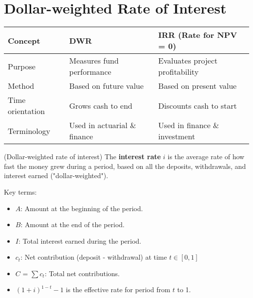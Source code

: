 \section{Dollar-weighted Rate of Interest}
\begin{table}[H]
\begin{center}
\renewcommand{\arraystretch}{1.5}
    \begin{tabular}{@{} l l l @{}}
    \toprule
    \textbf{Concept} & \textbf{DWR} & \textbf{IRR (Rate for NPV = 0)} \\
    \midrule
    Purpose & Measures fund performance & Evaluates project profitability \\
    Method & Based on future value & Based on present value \\
    Time orientation & Grows cash to end & Discounts cash to start \\
    Terminology & Used in actuarial \& finance & Used in finance \& investment \\
    \bottomrule
    \end{tabular}

\end{center}
\end{table}

\begin{definition}
    (Dollar-weighted rate of interest) The \textbf{interest rate} $i$ is the average rate of how fast the money grew during a period, based on all the 
    deposits, withdrawals, and interest earned ("dollar-weighted"). 
\end{definition}
\begin{comments}
    Key terms: 
    \begin{itemize}
        \item $A$: Amount at the beginning of the period.
        \item $B$: Amount at the end of the period.
        \item $I$: Total interest earned during the period.
        \item $c_t$: Net contribution (deposit - withdrawal) at time $t\in [0,1]$
        \item $C$ = $\sum{c_t}$: Total net contributions. 
        \item $(1+i)^{1-t}-1$ is the effective rate for period from $t$ to 1. 
    \end{itemize}
\end{comments}

